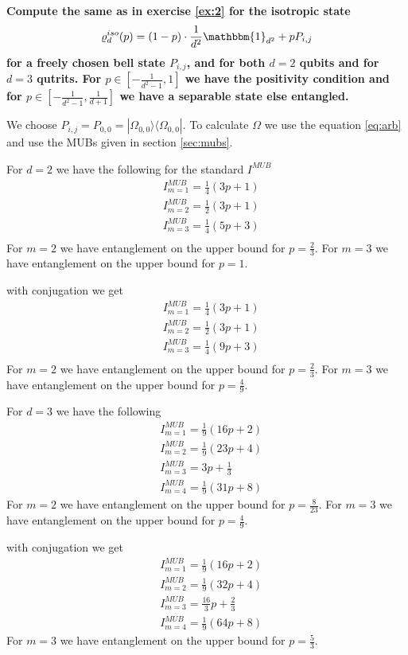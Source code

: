 \documentclass[a4paper]{article}
\newcounter{exercise}
\newenvironment{MyExercise}%
{\begin{mdframed}[style=exercisestyle]}{\end{mdframed}}
\begin{document}
\begin{MyExercise}
    \textbf{Compute the same as in exercise \ref{ex:2} for
    the isotropic state
    \begin{align}
        \varrho^{iso}_d (p) = (1-p)\cdot\frac{1}{d^2}\mathbbm{1}_{d^2} + p
        P_{i,j}
    \end{align}
    for a freely chosen bell state $P_{i,j}$, and for both $d=2$ qubits and for
    $d=3$ qutrits. For $p\in [-\frac{1}{d^2-1}, 1]$
    we have the positivity condition and for $p\in [-\frac{1}{d^2 -1},
    \frac{1}{d+1}]$ we have a separable state else entangled.
        }

    We choose $P_{i,j} = P_{0,0} = |\Omega_{0,0}\rangle \langle \Omega_{0,0}|$.
    To calculate $\Omega$ we use the equation \ref{eq:arb} and use the MUBs given
    in section \ref{sec:mubs}.

    For $d=2$ we have the following for the standard $I^{MUB}$
    \begin{align}
        &I^{MUB}_{m=1} = \frac{1}{4}(3p+1) \\
        &I^{MUB}_{m=2} = \frac{1}{2}(3p+1) \\
        &I^{MUB}_{m=3} = \frac{1}{4}(5p+3) \\
    \end{align}
    For $m=2$ we have entanglement on the upper bound for $p = \frac{2}{3}$.
    For $m=3$ we have entanglement on the upper bound for $p = 1$.


    with conjugation we get
    \begin{align}
        &I^{MUB}_{m=1} = \frac{1}{4}(3p+1) \\
        &I^{MUB}_{m=2} = \frac{1}{2}(3p+1) \\
        &I^{MUB}_{m=3} = \frac{1}{4}(9p+3) \\
    \end{align}
    For $m=2$ we have entanglement on the upper bound for $p = \frac{2}{3}$.
    For $m=3$ we have entanglement on the upper bound for $p = \frac{4}{9}$.

    For $d=3$ we have the following
    \begin{align}
        &I^{MUB}_{m=1} = \frac{1}{9}(16p+2) \\
        &I^{MUB}_{m=2} = \frac{1}{9}(23p+4) \\
        &I^{MUB}_{m=3} = 3p + \frac{1}{3}\\
        &I^{MUB}_{m=4} = \frac{1}{9}(31p + 8)
    \end{align}
    For $m=2$ we have entanglement on the upper bound for $p = \frac{8}{23}$.
    For $m=3$ we have entanglement on the upper bound for $p = \frac{4}{9}$.

    with conjugation we get
    \begin{align}
        &I^{MUB}_{m=1} = \frac{1}{9}(16p+2) \\
        &I^{MUB}_{m=2} = \frac{1}{9}(32p+4) \\
        &I^{MUB}_{m=3} = \frac{16}{3}p + \frac{2}{3}\\
        &I^{MUB}_{m=4} = \frac{1}{9}(64p + 8)
    \end{align}
    For $m=3$ we have entanglement on the upper bound for $p = \frac{5}{3}$.
\end{MyExercise}
\end{document}
